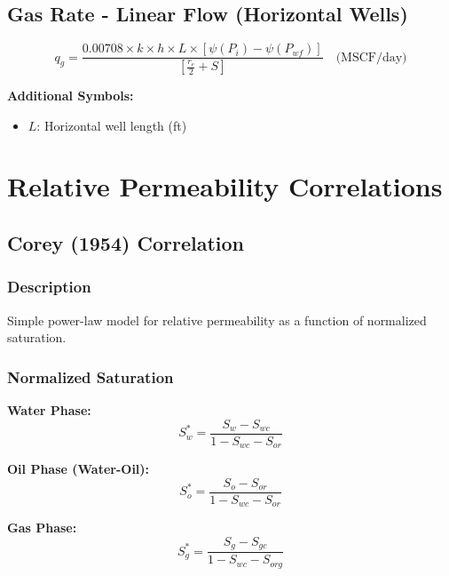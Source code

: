 \documentclass[11pt,a4paper]{article}
\newcommand{\symitem}[2]{\item \textbf{#1}: #2}
\begin{document}
\subsection{Gas Rate - Linear Flow (Horizontal Wells)}

\begin{tcolorbox}[colback=formulabox,colframe=black!75]
\begin{equation}
q_g = \frac{0.00708 \times k \times h \times L \times [\psi(P_i) - \psi(P_{wf})]}{\left[\frac{r_e}{2} + S\right]} \quad \text{(MSCF/day)}
\end{equation}
\end{tcolorbox}

\textbf{Additional Symbols:}
\begin{itemize}[leftmargin=2cm]
\symitem{$L$}{Horizontal well length (ft)}
\end{itemize}

\newpage

\section{Relative Permeability Correlations}

\subsection{Corey (1954) Correlation}

\subsubsection{Description}
Simple power-law model for relative permeability as a function of normalized saturation.

\subsubsection{Normalized Saturation}

\begin{tcolorbox}[colback=formulabox,colframe=black!75]
\textbf{Water Phase:}
\begin{equation}
S_w^* = \frac{S_w - S_{wc}}{1 - S_{wc} - S_{or}}
\end{equation}

\textbf{Oil Phase (Water-Oil):}
\begin{equation}
S_o^* = \frac{S_o - S_{or}}{1 - S_{wc} - S_{or}}
\end{equation}

\textbf{Gas Phase:}
\begin{equation}
S_g^* = \frac{S_g - S_{gc}}{1 - S_{wc} - S_{org}}
\end{equation}
\end{tcolorbox}
\end{document}
